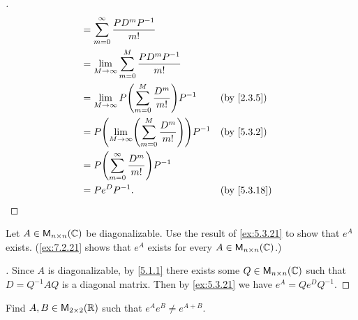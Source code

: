 \begin{proof}[]
\begin{align*}
		    & = \sum_{m = 0}^\infty \frac{P D^m P^{-1}}{m!}                                           \\
		    & = \lim_{M \to \infty} \sum_{m = 0}^M \frac{P D^m P^{-1}}{m!}                            \\
		    & = \lim_{M \to \infty} P \pa{\sum_{m = 0}^M \frac{D^m}{m!}} P^{-1}      &  & \by{2.3.5}  \\
		    & = P \pa{\lim_{M \to \infty} \pa{\sum_{m = 0}^M \frac{D^m}{m!}}} P^{-1} &  & \by{5.3.2}  \\
		    & = P \pa{\sum_{m = 0}^\infty \frac{D^m}{m!}} P^{-1}                                      \\
		    & = P e^D P^{-1}.                                                        &  & \by{5.3.18}
	\end{align*}
\end{proof}

\begin{ex}\label{ex:5.3.22}
	Let \(A \in \ms[n][n][\C]\) be diagonalizable.
	Use the result of \cref{ex:5.3.21} to show that \(e^A\) exists.
	(\cref{ex:7.2.21} shows that \(e^A\) exists for every \(A \in \ms[n][n][\C]\).)
\end{ex}

\begin{proof}[]
	Since \(A\) is diagonalizable, by \cref{5.1.1} there exists some \(Q \in \ms[n][n][\C]\) such that \(D = Q^{-1} A Q\) is a diagonal matrix.
	Then by \cref{ex:5.3.21} we have \(e^A = Q e^D Q^{-1}\).
\end{proof}

\begin{ex}\label{ex:5.3.23}
	Find \(A, B \in \ms[2][2][\R]\) such that \(e^A e^B \neq e^{A + B}\).
\end{ex}

